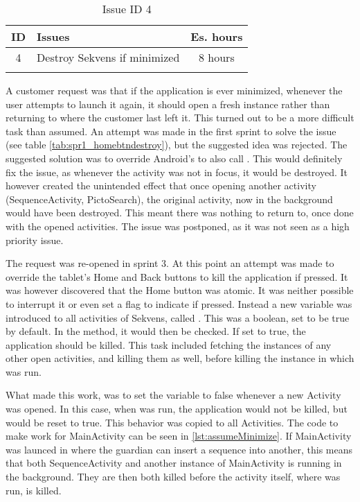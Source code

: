 \begin{longtable} { | c | p{12cm} | c | } 
\hline
	ID 	&	Issues	&		 Es. hours \\\hline
	4 	&	Destroy Sekvens if minimized	&	8 hours \\\hline
\caption{Issue ID 4}
\label{tab:spr3_homebuttonshoulddestroy}
\end{longtable}

A customer request was that if the application is ever minimized, whenever the user attempts to launch it again, it should open a fresh instance rather than returning to where the customer last left it. This turned out to be a more difficult task than assumed. An attempt was made in the first sprint to solve the issue (see table \ref{tab:spr1_homebtndestroy}), but the suggested idea was rejected. The suggested solution was to override Android's  to also call . This would definitely fix the issue, as whenever the activity was not in focus, it would be destroyed. It however created the unintended effect that once opening another activity (SequenceActivity, PictoSearch), the original activity, now in the background would have been destroyed. This meant there was nothing to return to, once done with the opened activities. The issue was postponed, as it was not seen as a high priority issue.

The request was re-opened in sprint 3. At this point an attempt was made to override the tablet's Home and Back buttons to kill the application if pressed. It was however discovered that the Home button was atomic. It was neither possible to interrupt it or even set a flag to indicate if pressed. Instead a new variable was introduced to all activities of Sekvens, called . This was a boolean, set to be true by default. In the  method, it would then be checked. If set to true, the application should be killed. This task included fetching the instances of any other open activities, and killing them as well, before killing the instance in which  was run.

What made this work, was to set the variable to false whenever a new Activity was opened. In this case, when  was run, the application would not be killed, but  would be reset to true. This behavior was copied to all Activities. The  code to make  work for MainActivity can be seen in \ref{lst:assumeMinimize}. If MainActivity was launced in  where the guardian can insert a sequence into another, this means that both SequenceActivity and another instance of MainActivity is running in the background. They are then both killed before the activity itself, where  was run, is killed.

